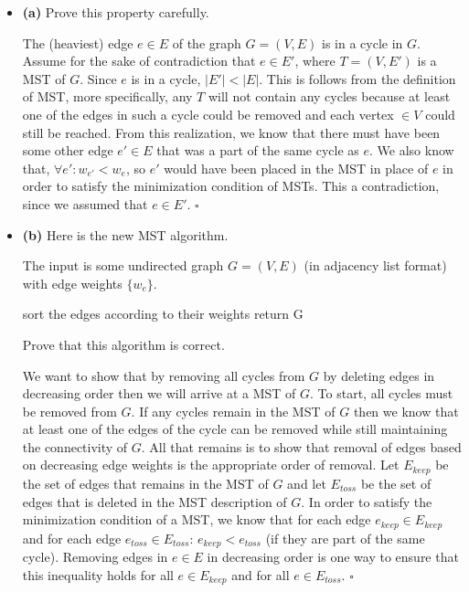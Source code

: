 \documentclass[11pt]{article}
\begin{document}
\begin{itemize}
\item[] {\bf (a)} Prove this property carefully.

The (heaviest) edge $e\in E$ of the graph $G=(V,E)$ is in a cycle in $G$. Assume for the sake of contradiction that $e\in E'$, where $T=(V,E')$ is a MST of $G$. 
Since $e$ is in a cycle, $|E'| < |E|$. This is follows from the definition of MST, more specifically, any $T$ will not contain any cycles because at least one of the edges in such a cycle could be removed and each vertex $\in V$ could still be reached. From this realization, we know that there must have been some other edge $e' \in E$ that was a part of the same cycle as $e$. We also know that, $\forall e': w_{e'}<w_{e}$, so $e'$ would have been placed in the MST in place of $e$ in order to satisfy the minimization condition of MSTs. This a contradiction, since we assumed that $e\in E'$. $\square$  
\item[] {\bf (b)} Here is the new MST algorithm. 

The input is some undirected graph $G = (V, E)$ (in adjacency list format) with edge weights $\{w_e\}$.

  \begin{algorithmic}
  \State sort the edges according to their weights
    \EndIf
  \EndFor
  \State return G
  \end{algorithmic}

Prove that this algorithm is correct.

We want to show that by removing all cycles from $G$ by deleting edges in decreasing order then we will arrive at a MST of $G$. To start, all cycles must be removed from $G$. If any cycles remain in the MST of $G$ then we know that at least one of the edges of the cycle can be removed while still maintaining the connectivity of $G$. All that remains is to show that removal of edges based on decreasing edge weights is the appropriate order of removal. Let $E_{keep}$ be the set of edges that remains in the MST of $G$ and let $E_{toss}$ be the set of edges that is deleted in the MST description of $G$. In order to satisfy the minimization condition of a MST, we know that for each edge $e_{keep} \in E_{keep}$ and for each edge $e_{toss} \in E_{toss}$: $e_{keep}<e_{toss}$ (if they are part of the same cycle). Removing edges in $e \in E$ in decreasing order is one way to ensure that this inequality holds for all $e\in E_{keep}$ and for all $e\in E_{toss}$. $\square$
\end{itemize}
\label{pg:end-of-p4}
\end{document}
